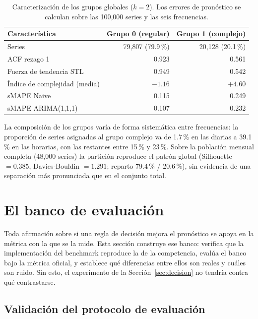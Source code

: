 \begin{table}[htbp]
\centering
\caption{Caracterización de los grupos globales ($k=2$). Los errores de pronóstico
se calculan sobre las 100{,}000 series y las seis frecuencias.}
\label{tab:clusters}
\begin{tabular}{lrr}
\toprule
\textbf{Característica} & \textbf{Grupo 0 (regular)} & \textbf{Grupo 1 (complejo)} \\
\midrule
Series                        & 79{,}807 (79.9\,\%) & 20{,}128 (20.1\,\%) \\
ACF rezago 1                  & 0.923  & 0.561 \\
Fuerza de tendencia STL       & 0.949  & 0.542 \\
Índice de complejidad (media) & $-1.16$ & $+4.60$ \\
sMAPE Naive                   & 0.115  & 0.249 \\
sMAPE ARIMA(1,1,1)            & 0.107  & 0.232 \\
\bottomrule
\end{tabular}
\end{table}

La composición de los grupos varía de forma sistemática entre frecuencias: la
proporción de series asignadas al grupo complejo va de 1.7\,\% en las diarias a
39.1\,\% en las horarias, con las restantes entre 15\,\% y 23\,\%. Sobre la
población mensual completa (48{,}000 series) la partición reproduce el patrón
global (Silhouette $=0.385$, Davies-Bouldin $=1.291$; reparto 79.4\,\% / 20.6\,\%),
sin evidencia de una separación más pronunciada que en el conjunto total.

\section{El banco de evaluación}\label{sec:banco}

Toda afirmación sobre si una regla de decisión mejora el pronóstico se apoya en
la métrica con la que se la mide. Esta sección construye ese banco: verifica que
la implementación del benchmark reproduce la de la competencia, evalúa el banco
bajo la métrica oficial, y establece qué diferencias entre ellos son reales y
cuáles son ruido. Sin esto, el experimento de la Sección~\ref{sec:decision} no
tendría contra qué contrastarse.

\subsection{Validación del protocolo de evaluación}\label{sec:validacion}

